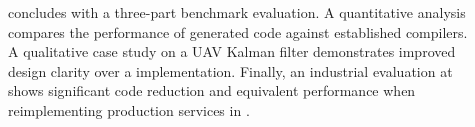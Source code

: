 \begin{description}
    \item[]
          concludes with a three-part benchmark evaluation. A quantitative analysis compares the
          performance of generated code against established \Lustre compilers. A qualitative case
          study on a UAV Kalman filter demonstrates improved design clarity over a \Ci
          implementation. Finally, an industrial evaluation at \ampere shows significant code
          reduction and equivalent performance when reimplementing production services in \GRust.
\end{description}












